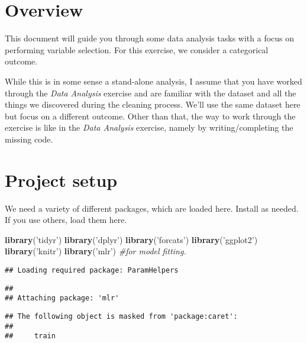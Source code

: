 \documentclass[]{article}
\title{}
\author{}
\date{}
\newenvironment{Shaded}{\begin{snugshade}}{\end{snugshade}}
\newcommand{\CommentTok}[1]{\textcolor[rgb]{0.56,0.35,0.01}{\textit{#1}}}
\newcommand{\KeywordTok}[1]{\textcolor[rgb]{0.13,0.29,0.53}{\textbf{#1}}}
\newcommand{\NormalTok}[1]{#1}
\newcommand{\StringTok}[1]{\textcolor[rgb]{0.31,0.60,0.02}{#1}}
\begin{document}
\hypertarget{overview}{%
\section{Overview}\label{overview}}

This document will guide you through some data analysis tasks with a
focus on performing variable selection. For this exercise, we consider a
categorical outcome.

While this is in some sense a stand-alone analysis, I assume that you
have worked through the \emph{Data Analysis} exercise and are familiar
with the dataset and all the things we discovered during the cleaning
process. We'll use the same dataset here but focus on a different
outcome. Other than that, the way to work through the exercise is like
in the \emph{Data Analysis} exercise, namely by writing/completing the
missing code.

\hypertarget{project-setup}{%
\section{Project setup}\label{project-setup}}

We need a variety of different packages, which are loaded here. Install
as needed. If you use others, load them here.

\begin{Shaded}
\begin{Highlighting}[]
\KeywordTok{library}\NormalTok{(}\StringTok{'tidyr'}\NormalTok{)}
\KeywordTok{library}\NormalTok{(}\StringTok{'dplyr'}\NormalTok{)}
\KeywordTok{library}\NormalTok{(}\StringTok{'forcats'}\NormalTok{)}
\KeywordTok{library}\NormalTok{(}\StringTok{'ggplot2'}\NormalTok{)}
\KeywordTok{library}\NormalTok{(}\StringTok{'knitr'}\NormalTok{)}
\KeywordTok{library}\NormalTok{(}\StringTok{'mlr'}\NormalTok{) }\CommentTok{#for model fitting.}
\end{Highlighting}
\end{Shaded}

\begin{verbatim}
## Loading required package: ParamHelpers
\end{verbatim}

\begin{verbatim}
## 
## Attaching package: 'mlr'
\end{verbatim}

\begin{verbatim}
## The following object is masked from 'package:caret':
## 
##     train
\end{verbatim}
\end{document}
